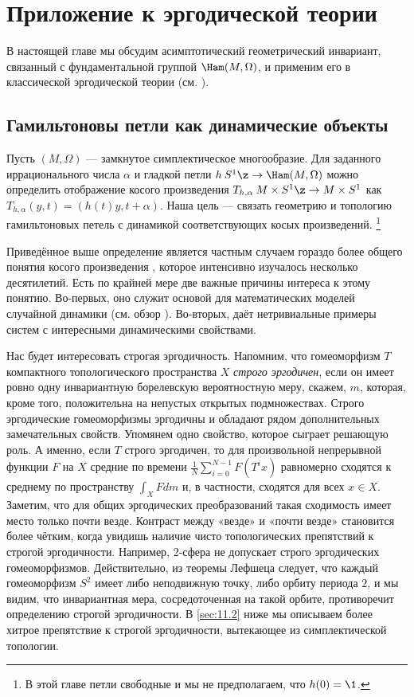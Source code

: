 \chapter[Эргодическая теория]{Приложение к эргодической теории}

В настоящей главе мы обсудим асимптотический геометрический инвариант, связанный с фундаментальной группой $\Ham(M, \Omega)$, и применим его в классической эргодической теории (см. \cite{P9}).

\section{Гамильтоновы петли как динамические объекты}\label{sec:11.1}

Пусть $(M,\Omega)$ --- замкнутое симплектическое многообразие.
Для заданного иррационального числа $\alpha$ и гладкой петли $h \: S^1 \z\to \Ham(M, \Omega)$ можно определить отображение косого произведения $T_{h,\alpha} \: M \times S^1 \z\to M\times S^1$ как $T_{h,\alpha} (y, t) = (h(t)y, t + \alpha)$.
Наша цель --- связать геометрию и топологию гамильтоновых петель с динамикой соответствующих косых произведений.%
\footnote{В этой главе петли свободные и мы не предполагаем, что $h(0) = \1$.}

Приведённое выше определение является частным случаем гораздо более общего понятия косого произведения  \cite[с. 231]{CFS}, которое интенсивно изучалось несколько десятилетий.
Есть по крайней мере две важные причины интереса к этому понятию.
Во-первых, оно служит основой для математических моделей случайной динамики (см. обзор \cite{Ki}).
Во-вторых, даёт нетривиальные примеры систем с интересными динамическими свойствами.

Нас будет интересовать строгая эргодичность.
Напомним, что гомеоморфизм $T$ компактного топологического пространства $X$ \emph{строго эргодичен}, если он имеет ровно одну инвариантную борелевскую вероятностную меру, скажем, $m$, которая, кроме того, положительна на непустых открытых подмножествах.
Строго эргодические гомеоморфизмы эргодичны и обладают рядом дополнительных замечательных свойств.
Упомянем одно свойство, которое сыграет решающую роль.
А именно, если $T$ строго эргодичен, то для произвольной непрерывной функции $F$ на $X$ средние по времени $\tfrac1N\sum_{i=0}^{N-1}F(T^ix)$ равномерно сходятся к среднему по пространству $\int_XFdm$ и, в частности, сходятся для всех $x \in X$.
Заметим, что для общих эргодических преобразований такая сходимость имеет место только почти везде.
Контраст между «везде» и «почти везде» становится более чётким, когда увидишь наличие чисто топологических препятствий к строгой эргодичности.
Например, 2-сфера не допускает строго эргодических гомеоморфизмов.
Действительно, из теоремы Лефшеца следует, что каждый гомеоморфизм $S^2$ имеет либо неподвижную точку, либо орбиту периода $2$, и мы видим, что инвариантная мера, сосредоточенная на такой орбите, противоречит определению строгой эргодичности.
В \ref{sec:11.2} ниже мы описываем более хитрое препятствие к строгой эргодичности, вытекающее из симплектической топологии.


